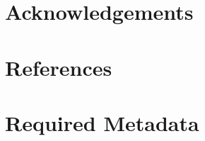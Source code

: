\documentclass[preprint,12pt, a4paper]{elsarticle}
\begin{document}
\appendix


\section*{Acknowledgements}
\label{}


\section*{References}
\label{}

 







\section*{Required Metadata}
\label{}


\end{document}
